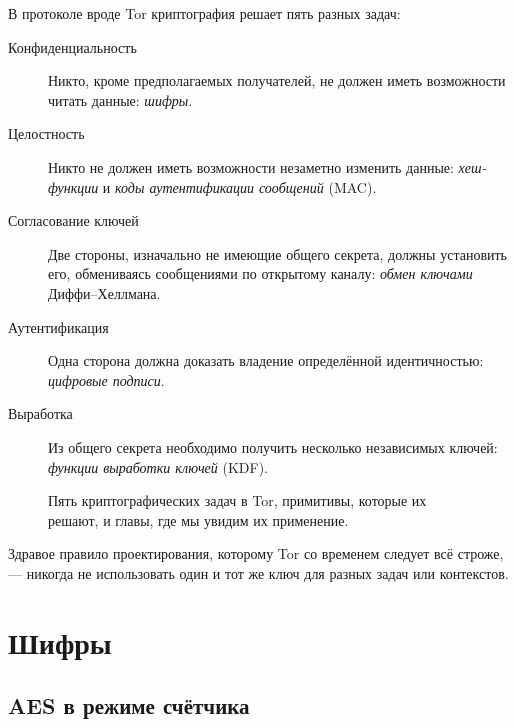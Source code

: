 В протоколе вроде Tor криптография решает пять разных задач:
\begin{description}
  \item[Конфиденциальность] Никто, кроме предполагаемых получателей, не должен иметь возможности читать данные: \emph{шифры}.
  \item[Целостность] Никто не должен иметь возможности незаметно изменить данные: \emph{хеш-функции} и \emph{коды аутентификации сообщений} (MAC).
  \item[Согласование ключей] Две стороны, изначально не имеющие общего секрета, должны установить его, обмениваясь сообщениями по открытому каналу: \emph{обмен ключами} Диффи--Хеллмана.
  \item[Аутентификация] Одна сторона должна доказать владение определённой идентичностью: \emph{цифровые подписи}.
  \item[Выработка] Из общего секрета необходимо получить несколько независимых ключей: \emph{функции выработки ключей} (KDF).
\end{description}
\begin{figure}[htbp]
\centering

\caption{Пять криптографических задач в Tor, примитивы, которые их решают, и главы, где мы увидим их применение.}
\label{fig:compiti}
\end{figure}

Здравое правило проектирования, которому Tor со временем следует всё строже, --- никогда не использовать один и тот же ключ для разных задач или контекстов.

\section{Шифры}\label{sec:cripto-cifrari}

\subsection{AES в режиме счётчика}

